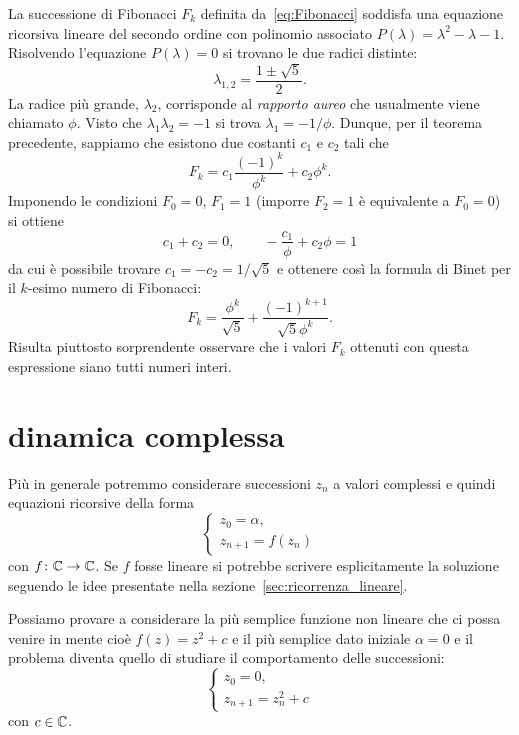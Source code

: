 \begin{example}
%
%
La successione di Fibonacci $F_k$ definita da~\eqref{eq:Fibonacci}
soddisfa una equazione ricorsiva lineare del secondo ordine con polinomio associato
$P(\lambda) = \lambda^2 - \lambda - 1$. Risolvendo l'equazione $P(\lambda)=0$
si trovano le due radici distinte:
\[
  \lambda_{1,2} = \frac{1 \pm \sqrt{5}}{2}.
\]
La radice più grande, $\lambda_2$, corrisponde al
\emph{rapporto aureo}%
 che usualmente viene chiamato $\phi$.
\index{$\phi$}%
Visto che $\lambda_1 \lambda_2 = -1$ si trova $\lambda_1 = -1/\phi$.
Dunque, per il teorema precedente, sappiamo che esistono due costanti $c_1$ e
$c_2$ tali che
\[
  F_k = c_1 \frac{(-1)^k}{\phi^k} + c_2 \phi^k .
\]
Imponendo le condizioni $F_0=0$, $F_1=1$ (imporre $F_2 = 1$ è equivalente a $F_0=0$)
si ottiene
\[
  c_1 + c_2 = 0, \qquad - \frac{c_1}{\phi} + c_2 \phi  = 1
\]
da cui è possibile trovare $c_1 = - c_2 = 1/\sqrt{5}$ e ottenere
così la formula di Binet per il $k$-esimo numero di Fibonacci:
%
%
%
%
%
\[
  F_k = \frac{\phi^k}{\sqrt 5} + \frac{(-1)^{k+1}}{\sqrt 5\phi^k}.
\]
Risulta piuttosto sorprendente osservare che i valori $F_k$ ottenuti
con questa espressione siano tutti numeri interi.
\end{example}

\section{dinamica complessa}
\label{sec:mandelbrot}

Più in generale potremmo considerare successioni $z_n$ a valori complessi
e quindi equazioni ricorsive della forma
\[
  \begin{cases}
    z_0 = \alpha, \\
    z_{n+1} = f(z_n)
  \end{cases}
\]
con $f\colon {\mathbb C} \to {\mathbb C}$.
Se $f$ fosse lineare si potrebbe scrivere esplicitamente la soluzione
seguendo le idee presentate nella sezione~\ref{sec:ricorrenza_lineare}.

Possiamo provare a considerare la più semplice funzione non lineare che ci possa
venire in mente cioè $f(z) = z^2 + c$ e il più semplice dato iniziale $\alpha = 0$
e il problema diventa quello di studiare il comportamento delle successioni:
\begin{equation}\label{eq:mandelbrot}
  \begin{cases}
    z_0 = 0, \\
    z_{n+1} = z_n^2 + c
  \end{cases}
\end{equation}
con $c\in {\mathbb C}$.

